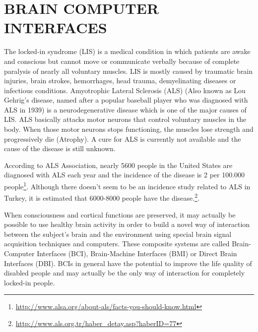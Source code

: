 \documentclass[12pt]{article}
\newcommand\mysection[1]{\vspace*{-0.35cm}\section{#1}\vspace*{6pt}\thispagestyle{empty}}
\numberwithin{equation}{section}
\numberwithin{figure}{section}
\numberwithin{table}{section}
\begin{document}
\mysection{BRAIN COMPUTER INTERFACES}\label{seq:bci}

\par{
    The locked-in syndrome (LIS) is a medical condition in which patients are awake and conscious but
    cannot move or communicate verbally because of complete paralysis of nearly all voluntary muscles.
    LIS is mostly caused by traumatic brain injuries, brain strokes, hemorrhages, head trauma, demyelinating diseases
    or infectious conditions. Amyotrophic Lateral Sclerosis (ALS) (Also known as Lou Gehrig's disease,
    named after a popular baseball player who was diagnosed with ALS in 1939) is a neurodegenerative disease
    which is one of the major causes of LIS. ALS basically attacks motor neurons that control voluntary muscles in the body.
    When those motor neurons stops functioning, the muscles lose strength and progressively die (Atrophy).
    A cure for ALS is currently not available and the cause of the disease is still unknown.
}

\par {
    According to ALS Association, nearly 5600 people in the United States are
    diagnosed with ALS each year and the incidence of the disease is 2 per 100.000
    people\footnote{\url{http://www.alsa.org/about-als/facts-you-should-know.html}}. Although
    there doesn't seem to be an incidence study related to ALS in Turkey, it is estimated that
    6000-8000 people have the disease.\footnote{\url{http://www.als.org.tr/haber_detay.asp?haberID=77}}.
}

\par{
    When consciousness and cortical functions are preserved, it may actually be
    possible to use healthy brain activity in order to build a novel way of interaction
    between the subject's brain and the environment using special brain signal
    acquisition techniques and computers. These composite systems are called
    Brain-Computer Interfaces (BCI), Brain-Machine Interfaces (BMI) or Direct Brain Interfaces (DBI).
    BCIs in general have the potential to improve the life quality of disabled people and may actually
    be the only way of interaction for completely locked-in people.
}
\end{document}
